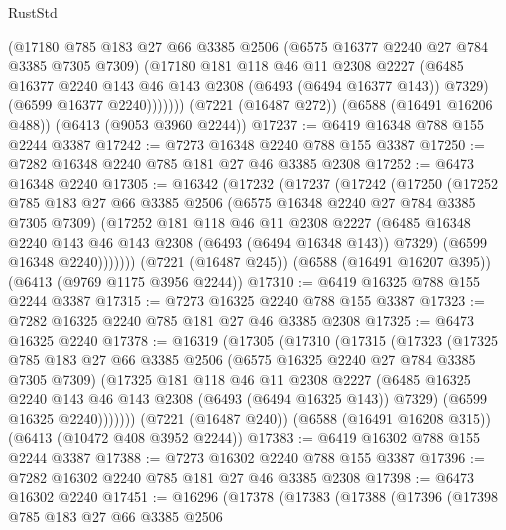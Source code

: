 \begin{lexlean}{RustStd}
\begin{coremodule}
            (@17180
              @785
              @183
              @27
              @66
              @3385
              @2506
              (@6575 @16377 @2240 @27 @784 @3385 @7305 @7309)
              (@17180
                @181
                @118
                @46
                @11
                @2308
                @2227
                (@6485 @16377 @2240 @143 @46 @143 @2308 (@6493 (@6494 @16377 @143)) @7329)
                (@6599 @16377 @2240)))))))
    (@7221 (@16487 @272))
    (@6588 (@16491 @16206 @488))
    (@6413 (@9053 @3960 @2244))
@17237 := @6419 @16348 @788 @155 @2244 @3387
@17242 := @7273 @16348 @2240 @788 @155 @3387
@17250 := @7282 @16348 @2240 @785 @181 @27 @46 @3385 @2308
@17252 := @6473 @16348 @2240
@17305 := @16342
    (@17232
      (@17237
        (@17242
          (@17250
            (@17252
              @785
              @183
              @27
              @66
              @3385
              @2506
              (@6575 @16348 @2240 @27 @784 @3385 @7305 @7309)
              (@17252
                @181
                @118
                @46
                @11
                @2308
                @2227
                (@6485 @16348 @2240 @143 @46 @143 @2308 (@6493 (@6494 @16348 @143)) @7329)
                (@6599 @16348 @2240)))))))
    (@7221 (@16487 @245))
    (@6588 (@16491 @16207 @395))
    (@6413 (@9769 @1175 @3956 @2244))
@17310 := @6419 @16325 @788 @155 @2244 @3387
@17315 := @7273 @16325 @2240 @788 @155 @3387
@17323 := @7282 @16325 @2240 @785 @181 @27 @46 @3385 @2308
@17325 := @6473 @16325 @2240
@17378 := @16319
    (@17305
      (@17310
        (@17315
          (@17323
            (@17325
              @785
              @183
              @27
              @66
              @3385
              @2506
              (@6575 @16325 @2240 @27 @784 @3385 @7305 @7309)
              (@17325
                @181
                @118
                @46
                @11
                @2308
                @2227
                (@6485 @16325 @2240 @143 @46 @143 @2308 (@6493 (@6494 @16325 @143)) @7329)
                (@6599 @16325 @2240)))))))
    (@7221 (@16487 @240))
    (@6588 (@16491 @16208 @315))
    (@6413 (@10472 @408 @3952 @2244))
@17383 := @6419 @16302 @788 @155 @2244 @3387
@17388 := @7273 @16302 @2240 @788 @155 @3387
@17396 := @7282 @16302 @2240 @785 @181 @27 @46 @3385 @2308
@17398 := @6473 @16302 @2240
@17451 := @16296
    (@17378
      (@17383
        (@17388
          (@17396
            (@17398
              @785
              @183
              @27
              @66
              @3385
              @2506

\end{coremodule}
\end{lexlean}
